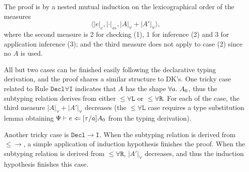The proof is by a nested mutual induction on the lexicographical order of the measures
$$\langle |e|_e, |\cdot|_\Leftrightarrow, |A|_\forall + |A'|_\forall \rangle,$$
where the second measure is 2 for checking (1), 1 for inference (2) and 3 for application inference (3);
and the third measure does not apply to case (2) since no $A$ is used.

All but two cases can be finished easily following the declarative typing derivation,
and the proof shares a similar structure to DK's.
One tricky case related to Rule $\mathtt{Decl\forall I}$ indicates that $A$ has the shape $\all A_0$,
thus the subtyping relation derives from either $\mathtt{{\le}\forall L}$ or $\mathtt{{\le}\forall R}$.
For each of the case, the third measure $|A|_\forall + |A'|_\forall$ decreases
(the $\mathtt{{\le}\forall L}$ case requires a type substitution lemma obtaining
$\Psi \vdash e \Leftarrow [\tau/a]A_0$ from the typing derivation).

Another tricky case is $\mathtt{Decl{\to}I}$.
When the subtyping relation is derived from $\mathtt{{\le}{\to}}$,
a simple application of induction hypothesis finishes the proof.
When the subtyping relation is derived from $\mathtt{{\le}\forall R}$,
$|A'|_\forall$ decreases, and thus the induction hypothesis finishes this case.

